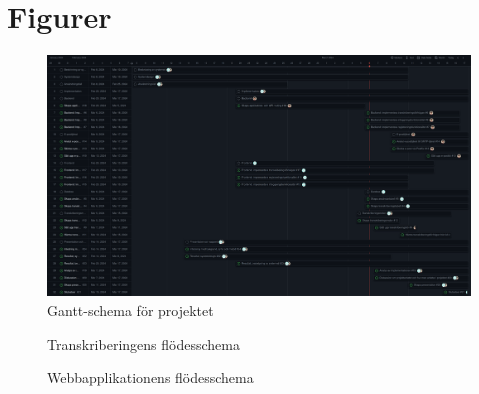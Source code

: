 \chapter{Figurer}

\begin{figure}[h]
  \centering
  \includegraphics[width=1\textwidth]{images/gantt}
  \caption{Gantt-schema för projektet}
  \label{fig:gantt}
\end{figure}

\begin{figure}[h]
  \centering
  
  \caption{Transkriberingens flödesschema}
  \label{fig:transcription-flowchart}
\end{figure}

\begin{figure}[h]
  \centering
  
  \caption{Webbapplikationens flödesschema}
  \label{fig:system-flowchart}
\end{figure}
